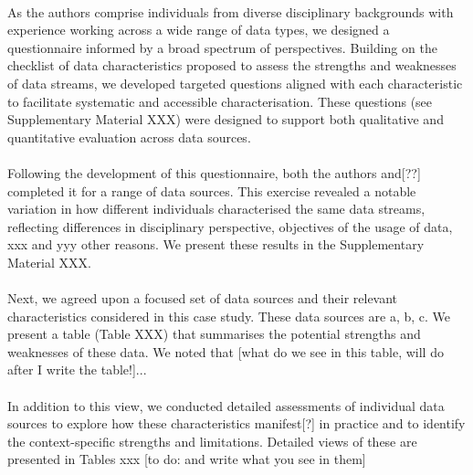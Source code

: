 \documentclass{article}
\begin{document}
\paragraph{}As the authors comprise individuals from diverse disciplinary backgrounds with experience working across a wide range of data types, we designed a questionnaire informed by a broad spectrum of perspectives. Building on the checklist of data characteristics proposed to assess the strengths and weaknesses of data streams, we developed targeted questions aligned with each characteristic to facilitate systematic and accessible characterisation. These questions (see Supplementary Material XXX) were designed to support both qualitative and quantitative evaluation across data sources. 

\paragraph{}Following the development of this questionnaire, both the authors and[??] completed it for a range of data sources. This exercise revealed a notable variation in how different individuals characterised the same data streams, reflecting differences in disciplinary perspective, objectives of the usage of data, xxx and yyy other reasons. We present these results in the Supplementary Material XXX. 

\paragraph{}Next, we agreed upon a focused set of data sources and their relevant characteristics considered in this case study. These data sources are a, b, c. We present a table (Table XXX) that summarises the potential strengths and weaknesses of these data. We noted that [what do we see in this table, will do after I write the table!]... 

\paragraph{}In addition to this view, we conducted detailed assessments of individual data sources to explore how these characteristics manifest[?] in practice and to identify the context-specific strengths and limitations. Detailed views of these are presented in Tables xxx [to do: and write what you see in them]
\end{document}
